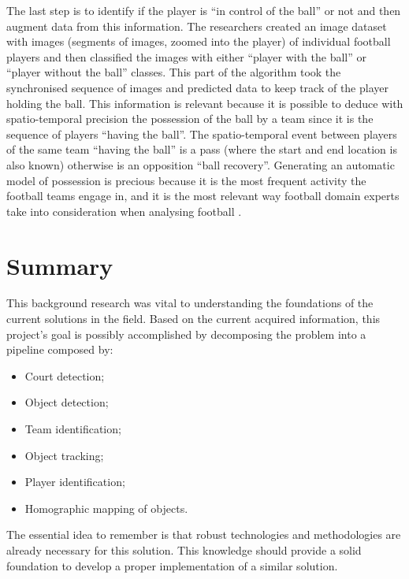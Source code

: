 \documentclass[
    11pt,
    oneside
]{report}
\begin{document}
The last step is to identify if the player is ``in control of the ball'' or not and then augment data from this information. The researchers created an image dataset with images (segments of images, zoomed into the player) of individual football players and then classified the images with either ``player with the ball'' or ``player without the ball'' classes. This part of the algorithm took the synchronised sequence of images and predicted data to keep track of the player holding the ball. This information is relevant because it is possible to deduce with spatio-temporal precision the possession of the ball by a team since it is the sequence of players ``having the ball''. The spatio-temporal event between players of the same team ``having the ball'' is a pass (where the start and end location is also known) otherwise is an opposition ``ball recovery''. Generating an automatic model of possession is precious because it is the most frequent activity the football teams engage in, and it is the most relevant way football domain experts take into consideration when analysing football \cite{cvpr_2018}.




\section{Summary}




This background research was vital to understanding the foundations of the current solutions in the field. Based on the current acquired information, this project's goal is possibly accomplished by decomposing the problem into a pipeline composed by:

\begin{itemize}
    \item Court detection;
    \item Object detection;
    \item Team identification;
    \item Object tracking;
    \item Player identification;
    \item Homographic mapping of objects.
\end{itemize}


The essential idea to remember is that robust technologies and methodologies are already necessary for this solution. This knowledge should provide a solid foundation to develop a proper implementation of a similar solution.
\end{document}
